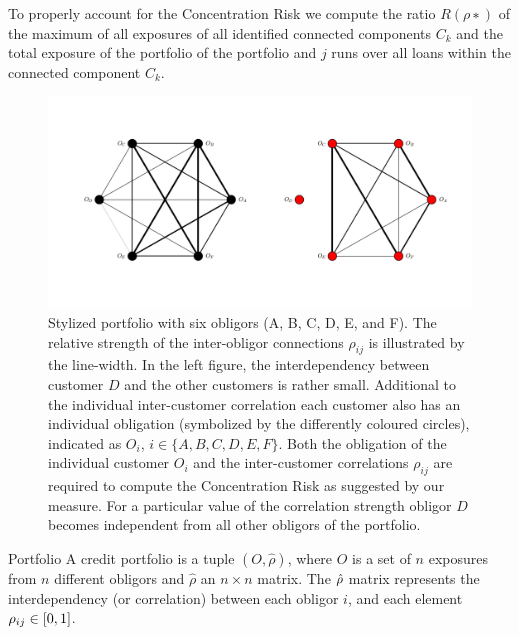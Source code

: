 \documentclass[12pt,beltcrest]{ociamthesis} %
\begin{document}
To properly account for the Concentration Risk we compute the ratio $R(ρ∗)$ of the maximum of all exposures of all identified connected components $C_k$ and the total exposure of the portfolio
of the portfolio and $j$ runs over all loans within the connected component $C_k$.
\begin{figure}[tb]
	\centering
	\includegraphics[scale=0.5]{figures/ramping_parameter_example.png}
	\caption[Graph representation of stylized portfolio with six obligors]{
Stylized portfolio with six obligors (A, B, C, D, E, and F).
The relative strength of the inter-obligor connections $\rho_{ij}$ is illustrated by the line-width.
In the left figure, the interdependency between customer $D$ and the other customers is rather small.
Additional to the individual inter-customer correlation each customer also has an individual obligation (symbolized by the differently coloured circles), indicated as $O_i$, $i \in \{A, B, C, D, E, F \}$.
Both the obligation of the individual customer $O_i$ and the inter-customer correlations $\rho_{ij}$ are required to compute the Concentration Risk as suggested by our measure.
For a particular value of the correlation strength obligor $D$ becomes independent from all other obligors of the portfolio.
	}
	\label{fig:6_pf_ramping}
\end{figure}

 
 
 
\begin{definition}{Portfolio}
A credit portfolio is a tuple $(O, \hat{\rho})$, where $O$ is a set of $n$ exposures from $n$ different obligors and $\hat{\rho}$ an $n \times n$ matrix.
The $\hat{\rho}$ matrix represents the interdependency (or correlation) between each obligor $i$, and each element $\rho_{ij} \in [0,1]$.
\end{definition}
\end{document}
